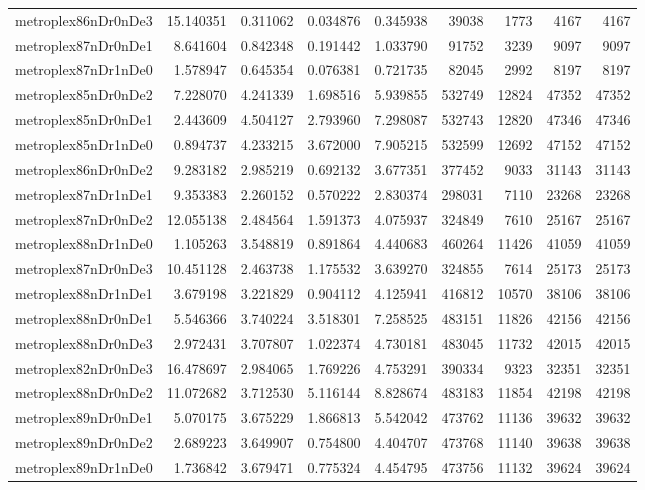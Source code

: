 \documentclass[../../../thesis.tex]{subfiles}
\begin{document}
\begin{longtable}{|l|r|r|r|r|r|r|r|r|}
metroplex86nDr0nDe3 & 15.140351 & 0.311062 & 0.034876 & 0.345938 & 39038 & 1773 & 4167 & 4167 \\
metroplex87nDr0nDe1 & 8.641604 & 0.842348 & 0.191442 & 1.033790 & 91752 & 3239 & 9097 & 9097 \\
metroplex87nDr1nDe0 & 1.578947 & 0.645354 & 0.076381 & 0.721735 & 82045 & 2992 & 8197 & 8197 \\
metroplex85nDr0nDe2 & 7.228070 & 4.241339 & 1.698516 & 5.939855 & 532749 & 12824 & 47352 & 47352 \\
metroplex85nDr0nDe1 & 2.443609 & 4.504127 & 2.793960 & 7.298087 & 532743 & 12820 & 47346 & 47346 \\
metroplex85nDr1nDe0 & 0.894737 & 4.233215 & 3.672000 & 7.905215 & 532599 & 12692 & 47152 & 47152 \\
metroplex86nDr0nDe2 & 9.283182 & 2.985219 & 0.692132 & 3.677351 & 377452 & 9033 & 31143 & 31143 \\
metroplex87nDr1nDe1 & 9.353383 & 2.260152 & 0.570222 & 2.830374 & 298031 & 7110 & 23268 & 23268 \\
metroplex87nDr0nDe2 & 12.055138 & 2.484564 & 1.591373 & 4.075937 & 324849 & 7610 & 25167 & 25167 \\
metroplex88nDr1nDe0 & 1.105263 & 3.548819 & 0.891864 & 4.440683 & 460264 & 11426 & 41059 & 41059 \\
metroplex87nDr0nDe3 & 10.451128 & 2.463738 & 1.175532 & 3.639270 & 324855 & 7614 & 25173 & 25173 \\
metroplex88nDr1nDe1 & 3.679198 & 3.221829 & 0.904112 & 4.125941 & 416812 & 10570 & 38106 & 38106 \\
metroplex88nDr0nDe1 & 5.546366 & 3.740224 & 3.518301 & 7.258525 & 483151 & 11826 & 42156 & 42156 \\
metroplex88nDr0nDe3 & 2.972431 & 3.707807 & 1.022374 & 4.730181 & 483045 & 11732 & 42015 & 42015 \\
metroplex82nDr0nDe3 & 16.478697 & 2.984065 & 1.769226 & 4.753291 & 390334 & 9323 & 32351 & 32351 \\
metroplex88nDr0nDe2 & 11.072682 & 3.712530 & 5.116144 & 8.828674 & 483183 & 11854 & 42198 & 42198 \\
metroplex89nDr0nDe1 & 5.070175 & 3.675229 & 1.866813 & 5.542042 & 473762 & 11136 & 39632 & 39632 \\
metroplex89nDr0nDe2 & 2.689223 & 3.649907 & 0.754800 & 4.404707 & 473768 & 11140 & 39638 & 39638 \\
metroplex89nDr1nDe0 & 1.736842 & 3.679471 & 0.775324 & 4.454795 & 473756 & 11132 & 39624 & 39624 \\

\end{longtable}
\end{document}
